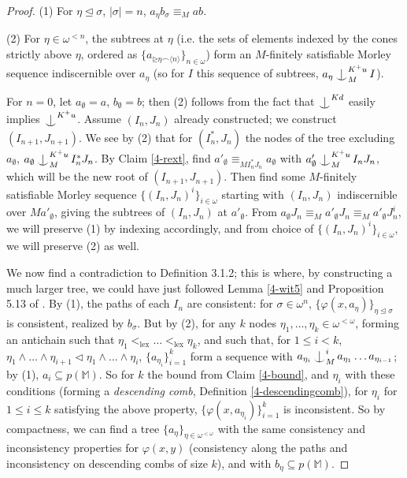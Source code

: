 \documentclass[12pt]{amsart}
\theoremstyle{definition}
\def\Ind#1#2{#1\setbox0=\hbox{$#1x$}\kern\wd0\hbox to 0pt{\hss$#1\mid$\hss}
\lower.9\ht0\hbox to 0pt{\hss$#1\smile$\hss}\kern\wd0}
\def\ind{\mathop{\mathpalette\Ind{}}}
\begin{document}
\begin{proof}
(1) For $\eta \unlhd \sigma$, $|\sigma| =n$, $a_{\eta}b_{\sigma} \equiv_{M} ab$.

(2) For $\eta \in \omega^{< n}$, the subtrees at $\eta$ (i.e. the sets of elements indexed by the cones strictly above $\eta$, ordered as $\{a_{\unrhd \eta \smallfrown \langle n \rangle}\}_{n \in \omega}$) form an $M$-finitely satisfiable Morley sequence indiscernible over $a_{\eta}$ (so for $I$ this sequence of subtrees, $a_{\eta} \ind^{K^{+}u}_{M} I$).


For $n =0$, let $a_{\emptyset}=a$, $b_{\emptyset} =b$; then (2) follows from the fact that $\ind^{Kd}$ easily implies $\ind^{K^{+}u}$. Assume $(I_{n}, J_{n})$ already constructed; we construct $(I_{n+1}, J_{n+1})$. We see by (2) that for $(I^{*}_{n}, J_{n})$ the nodes of the tree excluding $a_{\emptyset}$, $a_{\emptyset}\ind^{K^{+}u}_{M} I^{*}_{n} J_{n}$. By Claim \ref{4-rext}, find $a'_{\emptyset}\equiv_{MI^{*}_{n}J_{n}}a_{\emptyset}$ with $a'_{\emptyset} \ind^{K^{+}u}_{M} I_{n} J_{n}$, which will be the new root of $(I_{n+1}, J_{n+1})$. Then find some $M$-finitely satisfiable Morley sequence $\{(I_{n},J_{n})^{i}\}_{i \in \omega}$ starting with $(I_{n},J_{n})$ indiscernible over $Ma'_{\emptyset}$, giving the subtrees of $(I_{n}, J_{n})$ at $a'_{\emptyset}$. From $a_{\emptyset}J_{n} \equiv_{M} a'_{\emptyset}J_{n} \equiv_{M} a'_{\emptyset}J^{i}_{n}$, we will preserve (1) by indexing accordingly, and from choice of $\{(I_{n},J_{n})^{i}\}_{i \in \omega}$, we will preserve (2) as well.

We now find a contradiction to Definition 3.1.2; this is where, by constructing a much larger tree, we could have just followed Lemma \ref{4-wit5} and Proposition 5.13 of \cite{KR17}. By (1), the paths of each $I_{n}$ are consistent: for $\sigma \in \omega^{n}$, $\{\varphi(x, a_{\eta})\}_{\eta \unlhd \sigma}$ is consistent, realized by $b_{\sigma}$. But by (2), for any $k$ nodes $\eta_{1}, \ldots, \eta_{k} \in \omega^{<\omega}$, forming an antichain such that $\eta_{1} <_{\mathrm{lex}} \ldots <_{\mathrm{lex}} \eta_{k}$, and such that, for $1 \leq i < k$, $\eta_{1}\wedge \ldots \wedge \eta_{i+1} \lhd \eta_{1} \wedge \ldots \wedge \eta_{i}$, $\{a_{\eta_{i}}\}_{i = 1}^{k}$ form a sequence with $a_{\eta_{i}} \ind^{i}_{M} a_{\eta_{1}} \ldots a_{\eta_{i-1}}$; by (1), $a_{i} \subseteq p(\mathbb{M})$. So for $k$ the bound from Claim \ref{4-bound}, and $\eta_{i}$ with these conditions (forming a \textit{descending comb}, Definition \ref{4-descendingcomb}), for $\eta_{i}$ for $1 \leq i \leq k$ satisfying the above property, $\{\varphi(x, a_{\eta_{i}})\}_{i = 1}^{k}$ is inconsistent. So by compactness, we can find a tree $\{a_{\eta}\}_{\eta \in \omega^{< \omega}}$ with the same consistency and inconsistency properties for $\varphi(x, y)$ (consistency along the paths and inconsistency on descending combs of size $k$), and with $b_{\eta} \subseteq p(\mathbb{M})$.


\end{proof}
\end{document}
